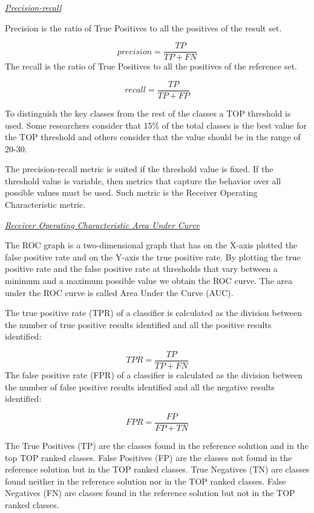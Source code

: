 \underline{\textit{Precision-recall}}


\hspace{-4em}Precision is the ratio of True Positives to all the positives of the result set.

\begin{equation}
 precision = \frac{TP}{TP+FN}
\end{equation}
The recall is the ratio of True Positives to all the positives of the reference set.

\begin{equation}
 recall = \frac{TP}{TP+FP}
\end{equation}

To distinguish the key classes from the rest of the classes a TOP threshold is used. Some researchers consider that 15\% of the total classes is the best value for the TOP threshold and others consider that the value should be in the range of 20-30. 

The precision-recall metric is suited if the threshold value is fixed. If the threshold value is variable, then metrics that capture the behavior over all possible values must be used. Such metric is the Receiver Operating Characteristic metric.

\underline{\textit{Receiver Operating Characteristic Area Under Curve}}


The ROC graph is a two-dimensional graph that has on the X-axis plotted the false positive rate and on the Y-axis the true positive rate. By plotting the true positive rate and the false positive rate at thresholds that vary between a minimum and a maximum possible value we obtain the ROC curve. The area under the ROC curve is called Area Under the Curve (AUC).

The true positive rate (TPR) of a classifier is calculated as the division between the number of true positive results identified and all the positive results identified:

\begin{equation}
TPR = \frac{TP}{TP+FN}
\end{equation}
The false positive rate (FPR) of a classifier is calculated as the division between the number of false positive results identified and all the negative results identified:

\begin{equation}
FPR = \frac{FP}{FP+TN}
\end{equation}


The True Positives (TP) are the classes found in the reference solution and in the top TOP ranked classes. False Positives (FP) are the classes not found in the reference solution but in the TOP ranked classes.
True Negatives (TN) are classes found neither in the reference solution nor in the TOP ranked classes. False Negatives (FN) are classes found in the reference solution but not in the TOP ranked classes.

